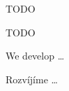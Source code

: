 \begin{thanks}
	TODO %
\end{thanks}

\begin{declaration}
	TODO %
\end{declaration}

\begin{abstract-english}
We develop \ldots
\end{abstract-english}

\begin{abstract-czech}
Rozvíjíme \ldots
\end{abstract-czech}
